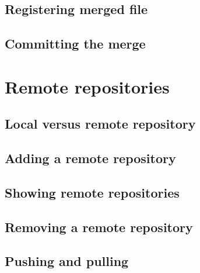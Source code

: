 \documentclass[10pt,a4paper]{beamer}
\begin{document}
\subsection{Registering merged file}
\begin{frame}

\end{frame}

\subsection{Committing the merge}
\begin{frame}

\end{frame}


\section{Remote repositories}

\subsection{Local versus remote repository}
\begin{frame}

\end{frame}

\subsection{Adding a remote repository}
\begin{frame}

\end{frame}

\subsection{Showing remote repositories}
\begin{frame}

\end{frame}

\subsection{Removing a remote repository}
\begin{frame}

\end{frame}

\subsection{Pushing and pulling}
\begin{frame}

\end{frame}
\end{document}
